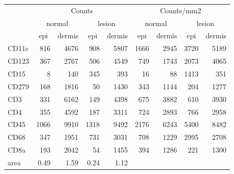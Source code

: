 \documentclass{article}
\begin{document}
\begin{tabular}{lrrrr|rrrr}
   \hline
 
         \multicolumn{1}{c}{} & \multicolumn{4}{c|}{Counts} & \multicolumn{4}{c}{Counts/mm2} \\ 
         \multicolumn{1}{c}{} & \multicolumn{2}{c}{normal} & \multicolumn{2}{c|}{lesion} & \multicolumn{2}{c}{normal} & \multicolumn{2}{c}{lesion}  \\ 
         \multicolumn{1}{c}{} & \multicolumn{1}{c}{epi} & dermis & \multicolumn{1}{c}{epi} & \multicolumn{1}{c|}{dermis} & \multicolumn{1}{c}{epi} & dermis & \multicolumn{1}{c}{epi} & dermis  \\ 
         \hline
    CD11c & 816 & 4676 & 908 & 5807 & 1666 & 2945 & 3720 & 5189 \\ 
  CD123 & 367 & 2767 & 506 & 4549 & 749 & 1743 & 2073 & 4065 \\ 
  CD15 & 8 & 140 & 345 & 393 & 16 & 88 & 1413 & 351 \\ 
  CD279 & 168 & 1816 & 50 & 1430 & 343 & 1144 & 204 & 1277 \\ 
  CD3 & 331 & 6162 & 149 & 4398 & 675 & 3882 & 610 & 3930 \\ 
  CD4 & 355 & 4592 & 187 & 3311 & 724 & 2893 & 766 & 2958 \\ 
  CD45 & 1066 & 9910 & 1318 & 9492 & 2176 & 6243 & 5400 & 8482 \\ 
  CD68 & 347 & 1951 & 731 & 3031 & 708 & 1229 & 2995 & 2708 \\ 
  CD8a & 193 & 2042 & 54 & 1455 & 394 & 1286 & 221 & 1300 \\ 
  area & 0.49 & 1.59 & 0.24 & 1.12 &    &    &    &    \\ 
   \hline
\end{tabular}
\end{document}
